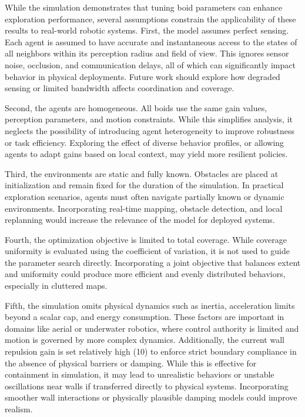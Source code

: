 \documentclass[12pt]{article}
\begin{document}
While the simulation demonstrates that tuning boid parameters can enhance exploration performance, several assumptions constrain the applicability of these results to real-world robotic systems. First, the model assumes perfect sensing. Each agent is assumed to have accurate and instantaneous access to the states of all neighbors within its perception radius and field of view. This ignores sensor noise, occlusion, and communication delays, all of which can significantly impact behavior in physical deployments. Future work should explore how degraded sensing or limited bandwidth affects coordination and coverage.

Second, the agents are homogeneous. All boids use the same gain values, perception parameters, and motion constraints. While this simplifies analysis, it neglects the possibility of introducing agent heterogeneity to improve robustness or task efficiency. Exploring the effect of diverse behavior profiles, or allowing agents to adapt gains based on local context, may yield more resilient policies.

Third, the environments are static and fully known. Obstacles are placed at initialization and remain fixed for the duration of the simulation. In practical exploration scenarios, agents must often navigate partially known or dynamic environments. Incorporating real-time mapping, obstacle detection, and local replanning would increase the relevance of the model for deployed systems.

Fourth, the optimization objective is limited to total coverage. While coverage uniformity is evaluated using the coefficient of variation, it is not used to guide the parameter search directly. Incorporating a joint objective that balances extent and uniformity could produce more efficient and evenly distributed behaviors, especially in cluttered maps.

Fifth, the simulation omits physical dynamics such as inertia, acceleration limits beyond a scalar cap, and energy consumption. These factors are important in domains like aerial or underwater robotics, where control authority is limited and motion is governed by more complex dynamics. Additionally, the current wall repulsion gain is set relatively high (10) to enforce strict boundary compliance in the absence of physical barriers or damping. While this is effective for containment in simulation, it may lead to unrealistic behaviors or unstable oscillations near walls if transferred directly to physical systems. Incorporating smoother wall interactions or physically plausible damping models could improve realism.
\end{document}
